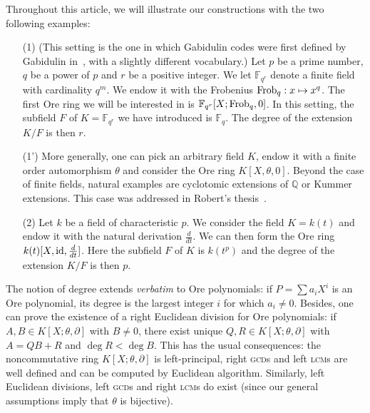 \documentclass[a4paper]{llncs}
\newcommand{\QQ}{\mathbb Q}
\newcommand{\FF}{\mathbb F}
\newcommand{\id}{\textrm{\rm id}}
\newcommand{\Frob}{\textrm{\rm Frob}}
\begin{document}
{\small
\begin{example}
\label{ex:Ore}
Throughout this article, we will illustrate our constructions 
with the two following examples:
\begin{itemize}
\renewcommand{\itemsep}{1ex}
\item[(1)] (This setting is the one in which Gabidulin codes were
first defined by Gabidulin in~\cite{gabidulin}, with a slightly different
vocabulary.)
Let $p$ be a prime number, $q$ be a power of $p$ and $r$
be a positive integer. We let $\FF_{q^r}$ denote a finite field
with cardinality $q^m$. We endow it with the Frobenius $\Frob_q :
x \mapsto x^q$. The first Ore ring we will be interested in is
$\FF_{q^r}[X ; \Frob_q, 0]$. In this setting, the subfield $F$ of 
$K = \FF_{q^r}$ we have introduced is $\FF_q$. The degree of the
extension $K/F$ is then $r$.
\item[(1')] More generally, one can pick an arbitrary field $K$,
endow it with a finite order automorphism $\theta$ and consider the
Ore ring $K[X,\theta,0]$. Beyond the case of finite fields, natural
examples are cyclotomic extensions of $\QQ$ or Kummer extensions.
This case was addressed in Robert's thesis~\cite{robert}.
\item[(2)] Let $k$ be a field of characteristic $p$. We consider the field 
$K = k(t)$ and endow it with the natural derivation $\frac d{dt}$. We can 
then form the Ore ring $k(t)[X,\id,\frac d{dt}]$. Here the subfield $F$ 
of $K$ is $k(t^p)$ and the degree of the extension $K/F$ is then $p$.
\end{itemize}
\end{example}}


The notion of degree extends \emph{verbatim} to Ore polynomials: if $P = 
\sum a_iX^i$ is an Ore polynomial, its degree is the largest integer $i$ 
for which $a_i \neq 0$.
Besides, one can prove the existence of a right Euclidean division for 
Ore polynomials: if $A, B \in K[X;\theta,\partial]$ with $B \neq 0$, 
there exist unique $Q, R \in K[X;\theta,\partial]$ with $A = QB+R$ and 
$\deg R < \deg B$. This has the usual consequences: the noncommutative
ring $K[X;\theta,\partial]$ is left-principal, right \textsc{gcd}s and
left \textsc{lcm}s are well defined and can be computed by Euclidean
algorithm. 
Similarly, left Euclidean divisions, left \textsc{gcd}s and right 
\textsc{lcm}s do exist (since our general assumptions imply that
$\theta$ is bijective).
\end{document}
